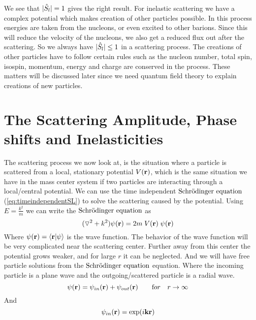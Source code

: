 %
We see that $|\hat{S}_{l}|=1$ gives the right result.
\nl
For inelastic scattering we have a complex potential which
makes creation of other particles possible. In this process energies are taken from the nucleons, or even excited
to other barions. 
Since this will reduce the velocity of the nucleons, we also get a reduced flux out after the scattering.
So we always have $|\hat{S}_{l}|\le 1$ in a scattering process. The creations of other particles have to
follow certain rules such as the nucleon number, total spin, isospin, momentum, energy and charge are 
conserved in the process. These matters will be discussed later since we need quantum field theory to 
explain creations of new particles. 





\section[Phase shifts and Inelasticities]{The Scattering Amplitude, Phase shifts and Inelasticities}  
%
The scattering process we now look at, is the situation where a particle is scattered from a
local, stationary potential $V({\bf r})$, which is the same situation we have in the mass center system
if two particles are interacting through a local/central potential.
We can use the time independent $\text{Schr$\ddot{\textrm{o}}$dinger equation}$ 
(\ref{eq:timeindependentSL}) to solve the scattering caused by the potential. 
Using $E=\frac{k^2}{m}$ we can write the  $\text{Schr$\ddot{\textrm{o}}$dinger equation}$ as
%
\begin{equation}\label{eq:Slfi} 
({\bf \triangledown}^2+k^2 )\psi ({\bf r})= 2m\; V({\bf r})\;\psi ({\bf r})
\end{equation}
%
Where $\psi ({\bf r}) = \langle{\bf r}|\psi\rangle$ is the wave function. The behavior of the wave function
will be very complicated near the scattering center. Further away from this center the potential grows weaker, 
and for large $r$ it can be neglected. And we will have free particle solutions from the $\text{Schr$\ddot{\textrm{o}}$dinger equation}$ equation.
Where the incoming particle is a plane wave and the outgoing/scattered particle is a radial wave.
%
\begin{equation}
\psi ({\bf r})=\psi_{in} ({\bf r})+\psi_{out} ({\bf r})\qquad {\text for}\quad r\to\infty
\end{equation}
And
\begin{equation}
\psi_{in} ({\bf r})=\exp (i{\bf kr})
\end{equation}
